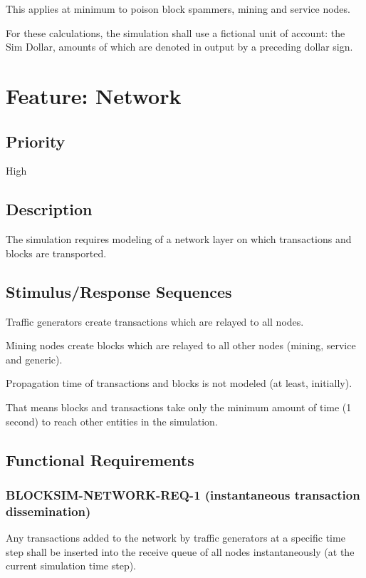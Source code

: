 \documentclass{scrreprt}
\begin{document}
This applies at minimum to poison block spammers, mining and service nodes.

For these calculations, the simulation shall use a fictional unit of account:
the Sim Dollar, amounts of which are denoted in output by a preceding dollar sign.


\section{Feature: Network}

\subsection{Priority}

High


\subsection{Description}

The simulation requires modeling of a network layer on which
transactions and blocks are transported.


\subsection{Stimulus/Response Sequences}

Traffic generators create transactions which are relayed to all nodes.

Mining nodes create blocks which are relayed to all other nodes (mining, service and generic).

Propagation time of transactions and blocks is not modeled (at least, initially).

That means blocks and transactions take only the minimum amount of time (1 second) to
reach other entities in the simulation.


\subsection{Functional Requirements}


\subsubsection{BLOCKSIM-NETWORK-REQ-1 (instantaneous transaction dissemination)}

Any transactions added to the network by traffic generators at a specific time step shall be inserted into the receive
queue of all nodes instantaneously (at the current simulation time step).
\end{document}
